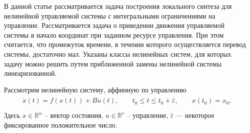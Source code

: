 \renewcommand{\theequation}{\arabic{section}.\arabic{equation}}
\newcommand{\pX}{{\mathcal X}}
\let\msf=\mathsf
\newcommand{\var}{\mathop{\sf Var}}
\setcounter{page}{1} %


\titlerus

\annotationandkeywordsrus



В данной статье рассматривается задача построения локального синтеза для нелинейной управляемой системы с интегральными ограничениями на управление. Рассматривается задача о  приведении движения управляемой системы в начало координат при заданном ресурсе управления. При этом считается, что промежуток времени, в течении которого осуществляется перевод системы, достаточно мал. Указаны классы нелинейных систем, для которых задачу можно решить путем приближенной замены нелинейной системы линеаризованной.

Рассмотрим нелинейную систему, аффинную по управлению
\begin{gather}\label{nonlinear}
	\begin{gathered}
		\dot{x}(t)=f(x(t))+B u(t), \qquad t_0 \leqslant t \leqslant t_0 + \bar{\varepsilon}, \qquad x(t_0) = x_0, \\
	\end{gathered}
\end{gather}
Здесь $ x \in \mathbb{R}^n $ -- вектор состояния, $ u \in \mathbb{R}^r $ -- управление,  $ \bar{\varepsilon} $ --- некоторое фиксированное положительное число.


